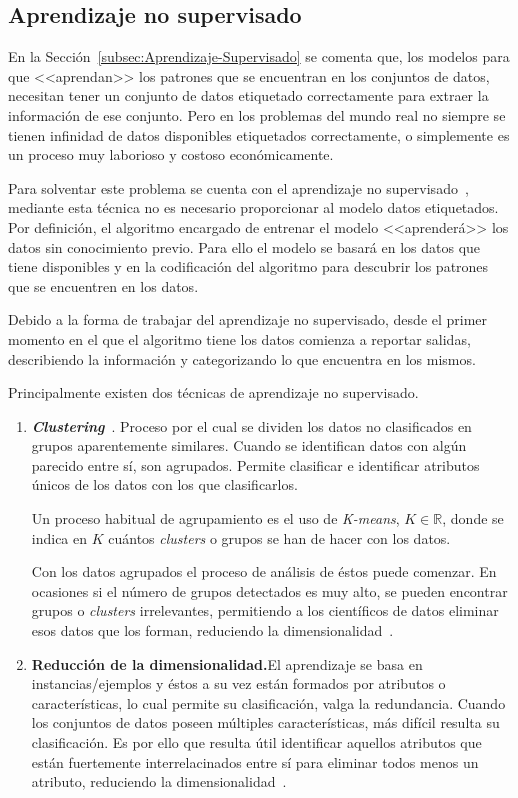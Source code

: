 \subsection{Aprendizaje no supervisado}\label{subsec:Aprendizaje-No-Supervisado}
En la Sección~\ref{subsec:Aprendizaje-Supervisado} se comenta que, los modelos para que <<aprendan>> los patrones que se encuentran en los conjuntos de datos, necesitan tener un conjunto de datos etiquetado correctamente para extraer la información de ese conjunto. Pero en los problemas del mundo real no siempre se tienen infinidad de datos disponibles etiquetados correctamente, o simplemente es un proceso muy laborioso y costoso económicamente.

Para solventar este problema se cuenta con el aprendizaje no supervisado~\cite{bengio2012unsupervised}, mediante esta técnica no es necesario proporcionar al modelo datos etiquetados. Por definición, el algoritmo encargado de entrenar el modelo  <<aprenderá>> los datos sin conocimiento previo. Para ello el modelo se basará en los datos que tiene disponibles y en la codificación del algoritmo para descubrir los patrones que se encuentren en los datos.

Debido a la forma de trabajar del aprendizaje no supervisado, desde el primer momento en el que el algoritmo tiene los datos comienza a reportar salidas, describiendo la información y categorizando lo que encuentra en los mismos.

Principalmente existen dos técnicas de aprendizaje no supervisado.
\begin{enumerate}
	\item \textbf{\textit{Clustering}}~\cite{unsupervised_learning_clustering}. Proceso por el cual se dividen los datos no clasificados en grupos aparentemente similares. Cuando se identifican datos con algún parecido entre sí, son agrupados. Permite clasificar e identificar atributos únicos de los datos con los que clasificarlos. 
	
	Un proceso habitual de agrupamiento es el uso de \textit{K-means}, $K\in\mathbb{R}$, donde se indica en $K$ cuántos \textit{clusters} o grupos se han de hacer con los datos. 
	
	Con los datos agrupados el proceso de análisis de éstos puede comenzar. En ocasiones si el número de grupos detectados es muy alto, se pueden encontrar grupos o \textit{clusters} irrelevantes, permitiendo a los científicos de datos eliminar esos datos que los forman, reduciendo la dimensionalidad~\cite{boutsidis2014randomized}.
	
	\item \textbf{Reducción de la dimensionalidad.}El aprendizaje se basa en instancias/ejemplos y éstos a su vez están formados por atributos o características, lo cual permite su clasificación, valga la redundancia. Cuando los conjuntos de datos poseen múltiples características, más difícil resulta su clasificación. Es por ello que resulta útil identificar aquellos atributos que están fuertemente interrelacinados entre sí para eliminar todos menos un atributo, reduciendo la dimensionalidad~\cite{li2002unsupervised}.
\end{enumerate}

